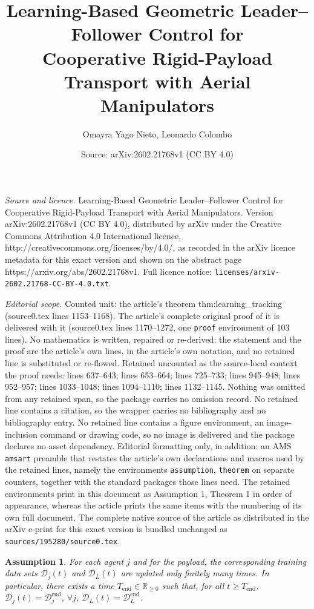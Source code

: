 \documentclass[10pt,a4paper]{amsart}
\title{Learning-Based Geometric Leader–Follower Control for\\ Cooperative Rigid-Payload Transport with Aerial Manipulators}
\author{Omayra Yago Nieto, Leonardo Colombo}
\date{Source: arXiv:2602.21768v1 (CC BY 4.0)}
\newtheorem{assumption}{Assumption}
\begin{document}
\maketitle

\noindent\emph{Source and licence.} Learning-Based Geometric Leader–Follower Control for\\ Cooperative Rigid-Payload Transport with Aerial Manipulators. Version arXiv:2602.21768v1 (CC BY 4.0), distributed by arXiv under the Creative Commons Attribution 4.0 International licence, http://creativecommons.org/licenses/by/4.0/, as recorded in the arXiv licence metadata for this exact version and shown on the abstract page https://arxiv.org/abs/2602.21768v1. Full licence notice: \texttt{licenses/arxiv-2602.21768-CC-BY-4.0.txt}.\par\smallskip

\noindent\textit{Editorial scope.} Counted unit: the article's theorem thm:learning\_tracking (source0.tex lines 1153--1168). The article's complete original proof of it is delivered with it (source0.tex lines 1170--1272, one \texttt{proof} environment of 103 lines). No mathematics is written, repaired or re-derived: the statement and the proof are the article's own lines, in the article's own notation, and no retained line is substituted or re-flowed.  Retained uncounted as the source-local context the proof needs: lines 637--643; lines 653--664; lines 725--733; lines 945--948; lines 952--957; lines 1033--1048; lines 1094--1110; lines 1132--1145.  Nothing was omitted from any retained span, so the package carries no omission record.  No retained line contains a citation, so the wrapper carries no bibliography and no bibliography entry.  No retained line contains a figure environment, an image-inclusion command or drawing code, so no image is delivered and the package declares no asset dependency.  Editorial formatting only, in addition: an AMS \texttt{amsart} preamble that restates the article's own declarations and macros used by the retained lines, namely the environments \texttt{assumption}, \texttt{theorem} on separate counters, together with the standard packages those lines need.  The retained environments print in this document as Assumption 1, Theorem 1 in order of appearance, whereas the article prints the same items with the numbering of its own full document.  The complete native source of the article as distributed in the arXiv e-print for this exact version is bundled unchanged as \texttt{sources/195280/source0.tex}.
\begin{assumption}
\label{ass:dataset}
For each agent $j$ and for the payload, the corresponding training data sets
$\mathcal D_j(t)$ and $\mathcal D_L(t)$ are updated only finitely many times.
In particular, there exists a time $T_{\mathrm{end}}\in\mathbb{R}_{\ge 0}$ such that,
for all $t\ge T_{\mathrm{end}}$, $\mathcal D_j(t)=\mathcal D_j^{\mathrm{end}}$, $\forall j$, $\mathcal D_L(t)=\mathcal D_L^{\mathrm{end}}$.
\end{assumption}
\end{document}

